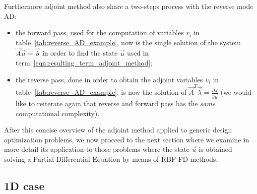 Furthermore adjoint method also share a two-steps process with the reverse mode AD:
\begin{itemize}
	\item the forward pass, used for the computation of variables $v_i$ in table~\vref{tab:reverse_AD_example}, now is the single solution of the system $\vec{A}\vec{u}=\vec{b}$ in order to find the state $\vec{u}$ used in term~\eqref{eqn:resulting_term_adjoint_method};
	\item the reverse pass, done in order to obtain the adjoint variables $\overline{v}_i$ in table~\ref{tab:reverse_AD_example}, is now the solution of $\vec{A}^T \vec{\lambda} = \frac{\partial J}{\partial \vec{u}}$ (we would like to reiterate again that reverse and forward pass has the \emph{same} computational complexity). 
\end{itemize}

After this concise overview of the adjoint method applied to generic design optimization problems, we now proceed to the next section where we examine in more detail its application to those problems where the state $\vec{u}$ is obtained solving a Partial Differential Equation by means of RBF-FD methods.

\subsection{1D case}
\label{subsec:adjoint_method_RBF-FD_1D}

